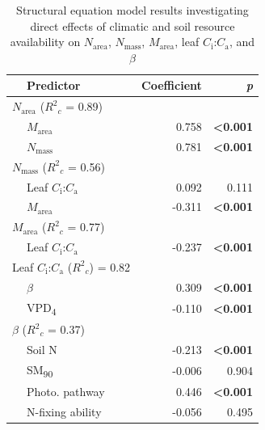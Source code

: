 \newpage
\begin{table}
    \centering
    \caption{Structural equation model results investigating direct effects of climatic and soil resource availability on $N_\mathrm{area}$, $N_\mathrm{mass}$, $M_\mathrm{area}$, leaf $C_\mathrm{i}$:$C_\mathrm{a}$, and $\beta$}
        \begin{tabular}{p{0.5cm}p{3cm}p{1.5cm}p{1.5cm}}
            \hline
            & Predictor & \multicolumn{1}{r}{Coefficient} & \multicolumn{1}{r}{\textit{p}} \\
            \hline

            \multicolumn{2}{l}{$N_\mathrm{area}$ ($R^2{}_c$ = 0.89)} && \\
            & \multicolumn{1}{l}{$M_\mathrm{area}$} & \multicolumn{1}{r}{0.758} & \multicolumn{1}{r}{\textbf{<0.001}} \\
            & \multicolumn{1}{l}{$N_\mathrm{mass}$} & \multicolumn{1}{r}{0.781} & \multicolumn{1}{r}{\textbf{<0.001}} \\
            \hline

            \multicolumn{2}{l}{$N_\mathrm{mass}$ ($R^2{}_c$ = 0.56)} && \\
            & \multicolumn{1}{l}{Leaf $C_\mathrm{i}$:$C_\mathrm{a}$} & \multicolumn{1}{r}{0.092} & \multicolumn{1}{r}{0.111} \\
            & \multicolumn{1}{l}{$M_\mathrm{area}$} & \multicolumn{1}{r}{-0.311} & \multicolumn{1}{r}{\textbf{<0.001}} \\
            \hline

            \multicolumn{2}{l}{$M_\mathrm{area}$ ($R^2{}_c$ = 0.77)} && \\
            & \multicolumn{1}{l}{Leaf $C_\mathrm{i}$:$C_\mathrm{a}$} & \multicolumn{1}{r}{-0.237} & \multicolumn{1}{r}{\textbf{<0.001}} \\
            \hline

            \multicolumn{2}{l}{Leaf $C_\mathrm{i}$:$C_\mathrm{a}$ ($R^2{}_c$) = 0.82} && \\
            & \multicolumn{1}{l}{$\beta$} & \multicolumn{1}{r}{0.309} & \multicolumn{1}{r}{\textbf{<0.001}} \\
            & \multicolumn{1}{l}{VPD\textsubscript{4}} & \multicolumn{1}{r}{-0.110} & \multicolumn{1}{r}{\textbf{<0.001}} \\
            \hline

            \multicolumn{2}{l}{$\beta$ ($R^2{}_c$ = 0.37)} && \\
            & \multicolumn{1}{l}{Soil N} & \multicolumn{1}{r}{-0.213} & \multicolumn{1}{r}{\textbf{<0.001}} \\
            & \multicolumn{1}{l}{SM\textsubscript{90}} & \multicolumn{1}{r}{-0.006} & \multicolumn{1}{r}{0.904} \\
            & \multicolumn{1}{l}{Photo. pathway} & \multicolumn{1}{r}{0.446} & \multicolumn{1}{r}{\textbf{<0.001}} \\
            & \multicolumn{1}{l}{N-fixing ability} & \multicolumn{1}{r}{-0.056} & \multicolumn{1}{r}{0.495} \\
            \hline


\end{tabular}
\end{table}

